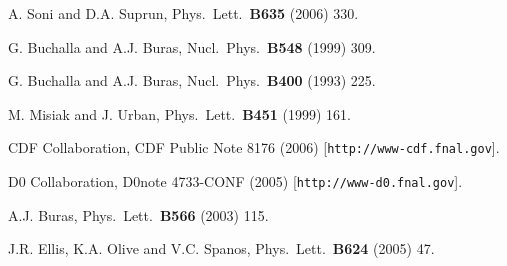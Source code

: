 \documentclass[12pt]{article}
\begin{document}
\begin{thebibliography}{999}
A. Soni and D.A. Suprun,
  Phys.\ Lett.\  {\bf B635} (2006) 330.

G. Buchalla and A.J. Buras,
{ Nucl.\ Phys.}~{\bf B548} (1999) 309.

G. Buchalla and A.J. Buras,
{ Nucl.\ Phys.}~{\bf B400} (1993) 225.

M. Misiak and J. Urban,
{ Phys.\ Lett.}~{\bf B451} (1999) 161.

CDF Collaboration, CDF Public Note 8176 (2006)
[{\tt http://www-cdf.fnal.gov}].

D0 Collaboration, D0note 4733-CONF (2005) 
[{\tt http://www-d0.fnal.gov}].

A.J. Buras,
{ Phys.\ Lett.}~{\bf B566} (2003) 115.

J.R. Ellis, K.A. Olive and V.C. Spanos,
 { Phys.\ Lett.}~{\bf B624} (2005) 47.

\end{thebibliography}
\end{document}
